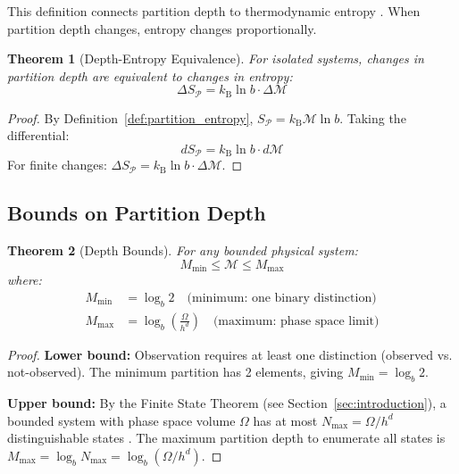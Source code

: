 \documentclass[twocolumn,10pt,a4paper]{article}
\newtheorem{theorem}{Theorem}[section]
\theoremstyle{definition}
\theoremstyle{remark}
\newcommand{\kB}{k_{\mathrm{B}}}
\newcommand{\Partition}{\mathcal{P}}
\newcommand{\Depth}{\mathcal{M}}
\newcommand{\Mmax}{M_{\mathrm{max}}}
\newcommand{\Mmin}{M_{\mathrm{min}}}
\begin{document}
This definition connects partition depth to thermodynamic entropy \cite{boltzmann1877}. When partition depth changes, entropy changes proportionally.

\begin{theorem}[Depth-Entropy Equivalence]
\label{thm:depth_entropy}
For isolated systems, changes in partition depth are equivalent to changes in entropy:
\begin{equation}
    \Delta S_{\Partition} = \kB \ln b \cdot \Delta\Depth
\end{equation}
\end{theorem}

\begin{proof}
By Definition~\ref{def:partition_entropy}, $S_{\Partition} = \kB \Depth \ln b$. Taking the differential:
\begin{equation}
    dS_{\Partition} = \kB \ln b \cdot d\Depth
\end{equation}
For finite changes: $\Delta S_{\Partition} = \kB \ln b \cdot \Delta\Depth$.
\end{proof}

\subsection{Bounds on Partition Depth}

\begin{theorem}[Depth Bounds]
\label{thm:bounds}
For any bounded physical system:
\begin{equation}
    \Mmin \leq \Depth \leq \Mmax
\end{equation}
where:
\begin{align}
    \Mmin &= \log_b 2 \quad \text{(minimum: one binary distinction)} \\
    \Mmax &= \log_b\left(\frac{\Omega}{h^d}\right) \quad \text{(maximum: phase space limit)}
\end{align}
\end{theorem}

\begin{proof}
\textbf{Lower bound:} Observation requires at least one distinction (observed vs. not-observed). The minimum partition has 2 elements, giving $\Mmin = \log_b 2$.

\textbf{Upper bound:} By the Finite State Theorem (see Section~\ref{sec:introduction}), a bounded system with phase space volume $\Omega$ has at most $N_{\max} = \Omega/h^d$ distinguishable states \cite{landau1980}. The maximum partition depth to enumerate all states is $\Mmax = \log_b N_{\max} = \log_b(\Omega/h^d)$.
\end{proof}
\end{document}
